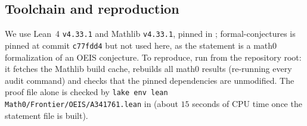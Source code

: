 \documentclass[11pt]{amsart}
\theoremstyle{plain}
\theoremstyle{definition}
\begin{document}
\subsection*{Toolchain and reproduction}
We use Lean~4 \cite{Lean4} \texttt{v4.33.1} and Mathlib \cite{Mathlib} \texttt{v4.33.1}, pinned in ; formal-conjectures \cite{FC} is pinned at commit \texttt{c77fdd4} but not used here, as the statement is a math0 formalization of an OEIS conjecture.
To reproduce, run  from the repository root: it fetches the Mathlib build cache, rebuilds all math0 results (re-running every audit command) and checks that the pinned dependencies are unmodified. The proof file alone is checked by \texttt{lake env lean Math0/Frontier/OEIS/A341761.lean} in  (about $15$ seconds of CPU time once the statement file is built).
\end{document}
